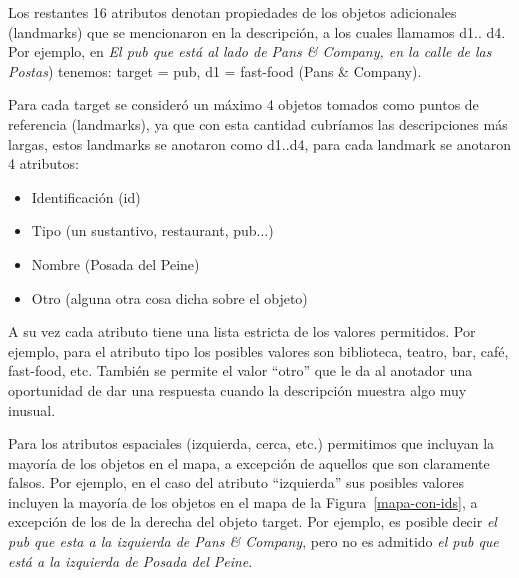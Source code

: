 \noindent
Los restantes 16 atributos denotan propiedades de los objetos adicionales (landmarks) que se mencionaron en la descripci\'on, a los cuales llamamos d1.. d4. Por ejemplo, en {\it El pub que est\'a al lado de Pans \& Company, en la calle de las Postas}) tenemos: target = pub, d1 = fast-food (Pans \& Company).%

Para cada target se consider\'o un m\'aximo 4 objetos tomados como puntos de referencia (landmarks), ya que con esta cantidad cubr\'iamos las descripciones m\'as largas, estos landmarks se anotaron como d1..d4, para cada landmark se anotaron 4 atributos:
\begin{itemize}
  \item Identificaci\'on (id)\\[-2em]
  \item Tipo (un sustantivo, restaurant, pub...)\\[-2em]
  \item Nombre (Posada del Peine)\\[-2em]
  \item Otro (alguna otra cosa dicha sobre el objeto)
\end{itemize}

A su vez cada atributo tiene una lista estricta de los valores permitidos. Por ejemplo, para el atributo tipo los posibles valores son biblioteca, teatro, bar, caf\'e, fast-food, etc. Tambi\'en se permite el valor ``otro'' que le da al anotador una oportunidad de dar una respuesta cuando la descripci\'on muestra algo muy inusual.

Para los atributos espaciales (izquierda, cerca, etc.) permitimos que incluyan la mayor\'{i}a de los objetos en el mapa, a excepci\'on de aquellos que son claramente falsos. Por ejemplo, en el caso del atributo ``izquierda'' sus posibles valores incluyen la mayor\'{i}a de los objetos en el mapa de la Figura~\ref{mapa-con-ids}, a excepci\'on de los de la derecha del objeto target. Por ejemplo, es posible decir {\it el pub que esta a la izquierda de Pans \& Company}, pero no es admitido {\it el pub que est\'a a la izquierda de Posada del Peine}.

